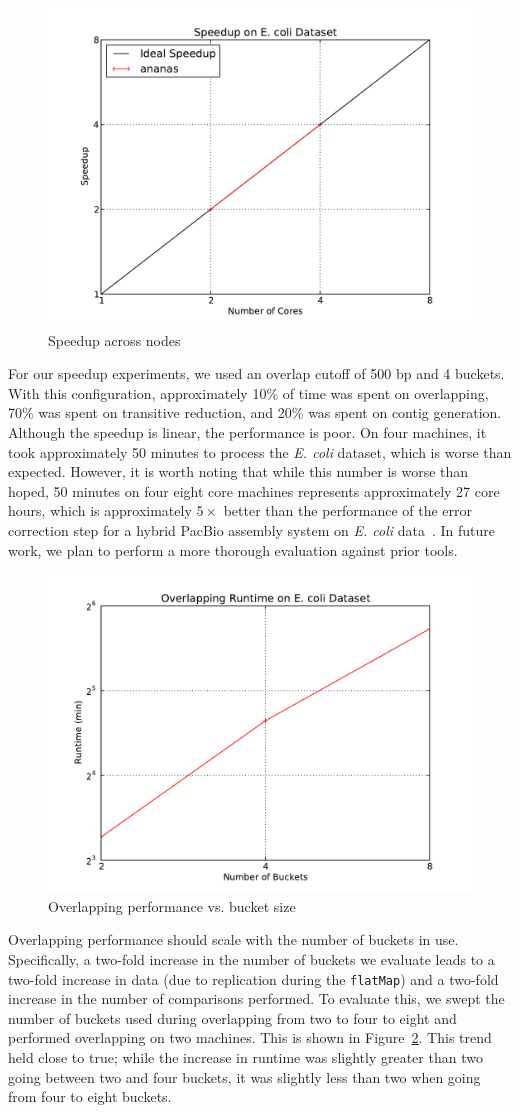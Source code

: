 \documentclass[11pt]{article}
\theoremstyle{plain}
\begin{document}
\begin{figure}[h]
\begin{center}
\includegraphics[width=0.4\linewidth]{graphs/speedup.pdf}
\end{center}
\caption{Speedup across nodes}
\label{fig:speedup}
\end{figure}

For our speedup experiments, we used an overlap cutoff of 500 bp and 4 buckets. With this configuration,
approximately 10\% of time was spent on overlapping, 70\% was spent on transitive reduction, and
20\% was spent on contig generation. Although the speedup is linear, the performance is poor. On four
machines, it took approximately 50 minutes to process the \emph{E. coli} dataset, which is worse than
expected. However, it is worth noting that while this number is worse than hoped, 50 minutes on four
eight core machines represents approximately 27 core hours, which is approximately $5\times$ better
than the performance of the error correction step for a hybrid PacBio assembly system on \emph{E. coli}
data~\cite{koren12}. In future work, we plan to perform a more thorough evaluation against prior tools.

\begin{figure}[h]
\begin{center}
\includegraphics[width=0.4\linewidth]{graphs/overlap.pdf}
\end{center}
\caption{Overlapping performance vs. bucket size}
\label{fig:overlap}
\end{figure}

Overlapping performance should scale with the number of buckets in use. Specifically, a two-fold increase
in the number of buckets we evaluate leads to a two-fold increase in data (due to replication during the
\texttt{flatMap}) and a two-fold increase in the number of comparisons performed. To evaluate this, we
swept the number of buckets used during overlapping from two to four to eight and performed overlapping
on two machines. This is shown in Figure~\ref{fig:overlap}. This trend held close to true; while the
increase in runtime was slightly greater than two going between two and four buckets, it was slightly
less than two when going from four to eight buckets.
\end{document}
